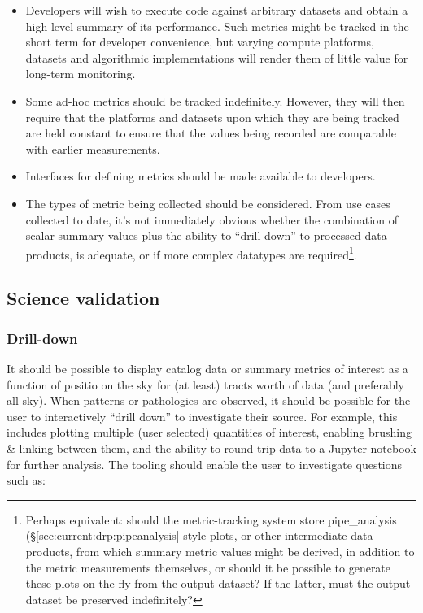 \documentclass[DM,authoryear,toc,lsstdraft]{lsstdoc}
\begin{document}
\begin{itemize}

  \item{Developers will wish to execute code against arbitrary datasets and
  obtain a high-level summary of its performance. Such metrics might be
  tracked in the short term for developer convenience, but varying compute
  platforms, datasets and algorithmic implementations will render them of
  little value for long-term monitoring.}

  \item{Some ad-hoc metrics should be tracked indefinitely. However, they will
  then require that the platforms and datasets upon which they are being
  tracked are held constant to ensure that the values being recorded are
  comparable with earlier measurements.}

  \item{Interfaces for defining metrics should be made available to
  developers.}

  \item{The types of metric being collected should be considered. From use
  cases collected to date, it's not immediately obvious whether the
  combination of scalar summary values plus the ability to “drill down” to
  processed data products, is adequate, or if more complex datatypes are
  required\footnote{Perhaps equivalent: should the metric-tracking system
  store pipe\_analysis (\S\ref{sec:current:drp:pipeanalysis}-style plots, or
  other intermediate data products, from which summary metric values might be
  derived, in addition to the metric measurements themselves, or should it be
  possible to generate these plots on the fly from the output dataset? If the
  latter, must the output dataset be preserved indefinitely?}.}

\end{itemize}

\subsection{Science validation}

\subsubsection{Drill-down}
\label{sec:requests:drill}

It should be possible to display catalog data or summary metrics of interest
as a function of positio on the sky for (at least) tracts worth of data (and
preferably all sky). When patterns or pathologies are observed, it should be
possible for the user to interactively ``drill down'' to investigate their
source. For example, this includes plotting multiple (user selected)
quantities of interest, enabling brushing \& linking between them, and the
ability to round-trip data to a Jupyter notebook for further analysis. The
tooling should enable the user to investigate questions such as:
\end{document}
